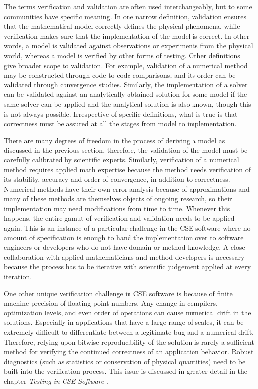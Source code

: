 The terms verification and
validation are often used interchangeably, but to some communities have specific meaning.  
In one narrow definition, validation ensures that the
mathematical model correctly defines the physical phenomena, while
verification makes sure that the implementation of the model is
correct. In other words, a model is validated against observations or
experiments from the physical world, whereas a model is verified by
other forms of testing.   Other definitions give broader scope to 
validation. For example, validation of a numerical
method may be constructed through code-to-code comparisons, and its
order can be validated through convergence studies. Similarly, the
implementation of a solver can be validated against an analytically
obtained solution for some model if the same solver can be
applied and the analytical solution is also known, though this is not
always possible.  Irrespective of  specific definitions, what is true is that
correctness must be assured at all the stages from model to
implementation.  

There are many degrees of freedom in the process of deriving a
model as discussed in the previous section, therefore, the validation of the
model must be carefully calibrated by scientific experts. Similarly,
verification of a numerical method requires applied math expertise
because the method needs verification of its stability, accuracy and
order of convergence, in addition to correctness. Numerical methods
have their own error analysis because of approximations and many of
these methods are themselves objects of ongoing research, so their
implementation may need modifications from time to time. Whenever
this happens, the entire gamut of verification and validation needs to
be applied again. This is an instance of a particular challenge in the
CSE software where no amount of specification is enough to hand the
implementation over to software engineers or developers who do not have domain or method knowledge. A close
collaboration with applied mathematicians and method developers is necessary because the process has to be iterative with
scientific judgement applied at every iteration. 

One other unique verification challenge in CSE software is because of finite machine precision of floating point
numbers. Any change in compilers, optimization levels, and even order
of operations can cause numerical drift in the solutions. Especially
in applications that have a large range of scales, it can be extremely
difficult to differentiate between a legitimate bug and a numerical
drift. Therefore, relying upon bitwise reproducibility of the solution is
rarely a sufficient method for verifying the continued correctness of
an application behavior. Robust diagnostics (such as statistics or
conservation of physical quantities) need to be built into the
verification process.  This issue is
discussed in greater detail in the chapter {\em Testing in CSE Software} .

